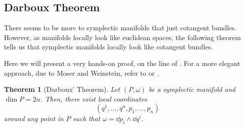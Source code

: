 \documentclass[english,fontsize=11pt,paper=b5]{scrbook}
\numberwithin{equation}{chapter}
\newtheorem{theorem}{Theorem}[chapter]
\theoremstyle{definition}
\begin{document}
    \subsection{Darboux Theorem}

    There seems to be more to symplectic manifolds that just cotangent bundles.
    However, as manifolds locally look like euclidean spaces, the following theorem tells us that symplectic manifolds locally look like cotangent bundles.

    Here we will present a very hands-on proof, on the line of \cite[Problem 22-19]{book:lee}. For a more elegant approach, due to Moser and Weinstein, refer to \cite[Chapter 22]{book:lee} or \cite[Chapter 10.3]{book:knauf}.

    \begin{theorem}[Darboux' Theorem]
      Let $(P, \omega)$ be a symplectic manifold and $\dim P = 2n$.
      Then, there exist local coordinates
      \begin{equation}
        (q^1, \ldots, q^n, p_1, \ldots, p_n)
      \end{equation} around any point in $P$ such that $\omega = \dd p_i \wedge \dd q^i$.
    \end{theorem}
\end{document}
